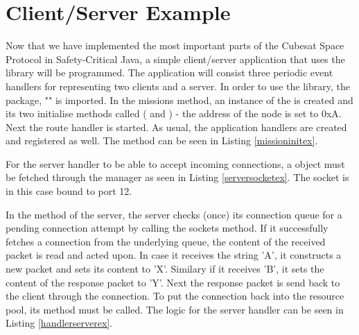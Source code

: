 \section{Client/Server Example} %
\label{sec:client_server_example}
Now that we have implemented the most important parts of the Cubesat Space Protocol in Safety-Critical Java, a simple client/server application that uses the library will be programmed. The application will consist three periodic event handlers for representing two clients and a server. In order to use the library, the package, "" is imported. In the missions  method, an instance of the  is created and its two initialise methods called ( and ) - the address of the node is set to 0xA. Next the route handler is started. As usual, the application handlers are created and registered as well. The  method can be seen in Listing \ref{missioninitex}. 



For the server handler to be able to accept incoming connections, a  object must be fetched through the manager as seen in Listing \ref{serversocketex}. The socket is in this case bound to port 12.



In the  method of the server, the server checks (once) its connection queue for a pending connection attempt by calling the sockets  method. If it successfully fetches a connection from the underlying queue, the content of the received packet is read and acted upon. In case it receives the string 'A', it constructs a new packet and sets its content to 'X'. Similary if it receives 'B', it sets the content of the response packet to 'Y'. Next the response packet is send back to the client through the connection. To put the connection back into the resource pool, its  method must be called. The logic for the server handler can be seen in Listing \ref{handlerserverex}.




